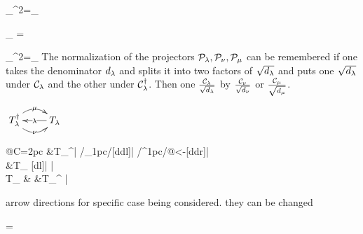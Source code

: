 \beq
\calp_\nu^2=\calp_\nu
\eeq



\beq
{\color{green}\calp_\mu}
=
\bcen
{}
\ecen
\eeq

\beq
\calp_\mu^2=\calp_\mu
\eeq
The normalization of the projectors ${\cal P}_\lambda, {\cal P}_\nu, {\cal P}_\mu$ can be remembered if 
one takes the denominator $d_\lambda$ and splits it into two factors of $\sqrt{d_\lambda}$
and puts one $\sqrt{d_\lambda}$
under ${\cal C}_\lambda$
and the other under ${\cal C}^\dagger_\lambda$. Then
one  $\frac{{\cal C}_\lambda}{\sqrt{d_\lambda}}$
by
$\frac{{\cal C}_\nu}{\sqrt{d_\nu}}$
or
$\frac{{\cal C}_\mu}{\sqrt{d_\mu}}$.


\newcommand{\trij}[3]{
\xymatrix{
T_#2^\dagger
\ar@/^1pc/[r]|#1
\ar@/_1pc/[r]|#3
&T_#2\ar[l]|#2
}
}

$
\trij{\mu}{\lam}{\nu}
$

\newcommand{\kten}[3]{
K\indices{
_#1^#2^#3}
}

\newcommand{\sixj}[6]{
\xymatrix@R=2pc@C=2pc{
&T_#5^\dagger\ar[d]|#1
\ar@/_1pc/[ddl]|#6
\ar@/^1pc/@{<-}[ddr]|#5
\\
&T_#3
\ar@{<-}[dl]|#2
\ar[dr]|#3
\\
T_#2
&
&T_#3^\dagger
\ar[ll]|#4
}
}

\sixj{\lam}{\mu}{\nu}{\omega}{\rho}{\s}

arrow directions 
for specific case being
considered.
they can be changed

\beq
\bcen
{}
\ecen
=
{\sqrt{
\kten{\lam}{\nu}{\mu}
}}
\bcen
{}
\ecen
\eeq

\beq
\bcen
{}
\ecen
\neq
\bcen
{}
\ecen
\eeq


